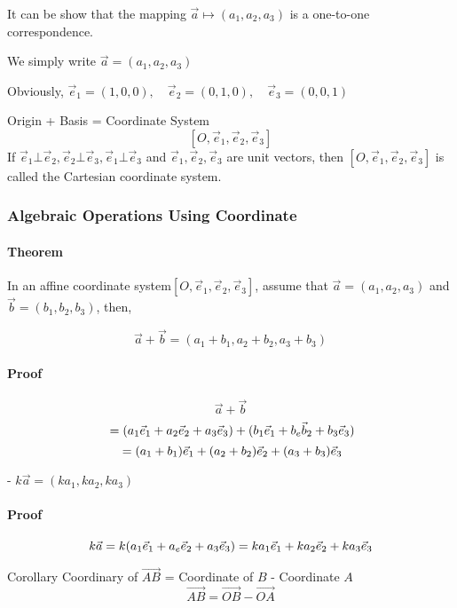 \documentclass[UTF8]{ctexart}
\begin{document}
  It can be show that the mapping $\vec a \mapsto   (a_1,a_2,a_3)$ is a one-to-one  correspondence.

  We simply write $\vec a  = (a_1,a_2,a_3)$ 

  Obviously, $\vec e_1 = (1,0,0),\quad \vec e_2 = (0,1,0), \quad \vec e_3 = (0,0,1)$

  Origin + Basis = Coordinate System
$$
[O,\vec e_1,\vec e_2,\vec e_3]
$$
If $\vec e_1 \bot \vec e_2, \vec e_2 \bot \vec e_3, \vec e_1 \bot \vec e_3$ and $\vec e_1,\vec e_2, \vec e_3$ are unit vectors, then $[O,\vec e_1,\vec e_2,\vec e_3]$ is called the Cartesian coordinate system.

\subsubsection{ Algebraic Operations Using Coordinate }

\paragraph{ Theorem}  In an affine coordinate system$[O,\vec e_1,\vec e_2,\vec e_3]$, assume that $\vec a = (a_1,a_2,a_3)$ and $\vec b = (b_1,b_2,b_3)$, then,

$$\vec a +\vec b = (a_1+b_1,a_2+b_2,a_3+b_3)$$

\paragraph{ Proof}
  $$
  \vec a + \vec b  
  $$
  $$
  \\ = (a_1\vec e_1 + a_2 \vec e_2 + a_3\vec e_3 )+ (b_1\vec e_1 + b_e \vec b_2 + b_3\vec e_3 ) 
  $$
  $$
  \\ = (a_1+b_1)\vec e_1 + (a_2+b_2) \vec e_2 + (a_3+b_3) \vec e_3
  $$
  
- $k \vec a  = (ka_1,ka_2,ka_3)$

\paragraph{ Proof}
  $$
  k \vec a 
  \\ = k(a_1\vec e_1 + a_e \vec e_2 + a_3\vec e_3 )
  \\ = ka_1\vec e_1 + k a_2 \vec e_2 + k a_3\vec e_3
  $$
  

Corollary Coordinary of $\overrightarrow {AB}$ = Coordinate of $B$  - Coordinate $A$
$$
\overrightarrow{AB} = \overrightarrow{OB} - \overrightarrow {OA}
$$
\end{document}

